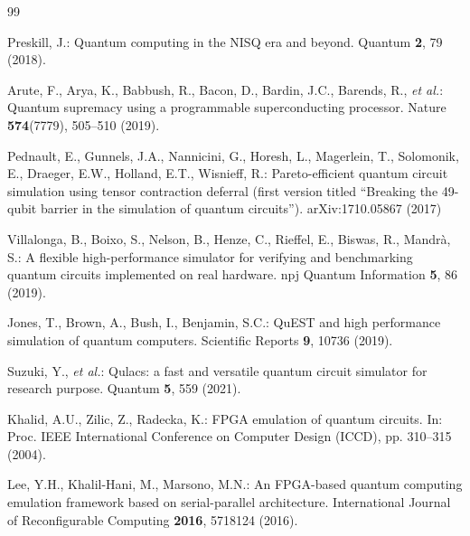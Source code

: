 \begin{thebibliography}{99}

Preskill, J.: Quantum computing in the NISQ era and beyond. Quantum \textbf{2}, 79 (2018). 

Arute, F., Arya, K., Babbush, R., Bacon, D., Bardin, J.C., Barends, R., \emph{et al.}: Quantum supremacy using a programmable superconducting processor. Nature \textbf{574}(7779), 505--510 (2019). 

Pednault, E., Gunnels, J.A., Nannicini, G., Horesh, L., Magerlein, T., Solomonik, E., Draeger, E.W., Holland, E.T., Wisnieff, R.: Pareto-efficient quantum circuit simulation using tensor contraction deferral (first version titled ``Breaking the 49-qubit barrier in the simulation of quantum circuits''). arXiv:1710.05867 (2017)

Villalonga, B., Boixo, S., Nelson, B., Henze, C., Rieffel, E., Biswas, R., Mandr\`a, S.: A flexible high-performance simulator for verifying and benchmarking quantum circuits implemented on real hardware. npj Quantum Information \textbf{5}, 86 (2019). 

Jones, T., Brown, A., Bush, I., Benjamin, S.C.: QuEST and high performance simulation of quantum computers. Scientific Reports \textbf{9}, 10736 (2019). 

Suzuki, Y., \emph{et al.}: Qulacs: a fast and versatile quantum circuit simulator for research purpose. Quantum \textbf{5}, 559 (2021). 

Khalid, A.U., Zilic, Z., Radecka, K.: FPGA emulation of quantum circuits. In: Proc. IEEE International Conference on Computer Design (ICCD), pp. 310--315 (2004). 

Lee, Y.H., Khalil-Hani, M., Marsono, M.N.: An FPGA-based quantum computing emulation framework based on serial-parallel architecture. International Journal of Reconfigurable Computing \textbf{2016}, 5718124 (2016). 


\end{thebibliography}
